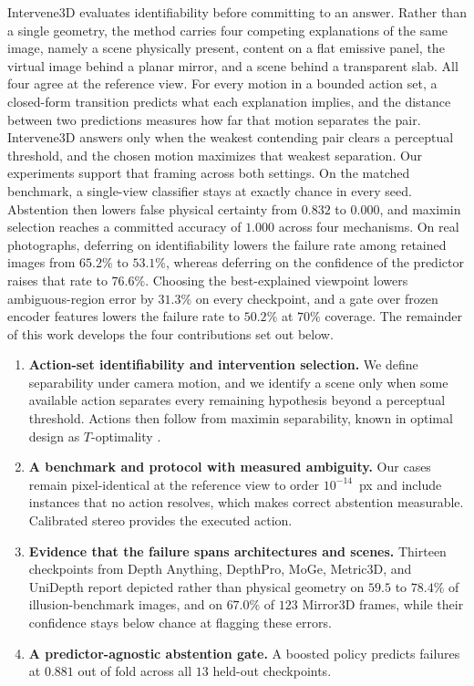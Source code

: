 \documentclass{article} %
\theoremstyle{defstyle}
\theoremstyle{plain}
\begin{document}
Intervene3D evaluates identifiability before committing to an answer. Rather than a single
geometry, the method carries four competing explanations of the same image, namely a scene
physically present, content on a flat emissive panel, the virtual image behind a planar mirror,
and a scene behind a transparent slab. All four agree at the reference view. For every motion
in a bounded action set, a closed-form transition predicts what each explanation implies, and
the distance between two predictions measures how far that motion separates the pair.
Intervene3D answers only when the weakest contending pair clears a perceptual threshold, and
the chosen motion maximizes that weakest separation. Our experiments support that framing
across both settings. On the matched benchmark, a single-view classifier stays at exactly
chance in every seed. Abstention then lowers false physical certainty from $0.832$ to $0.000$,
and maximin selection reaches a committed accuracy of $1.000$ across four mechanisms. On real
photographs, deferring on identifiability lowers the failure rate among retained images from
$65.2\%$ to $53.1\%$, whereas deferring on the confidence of the predictor raises that rate to
$76.6\%$. Choosing the best-explained viewpoint lowers ambiguous-region error by $31.3\%$ on
every checkpoint, and a gate over frozen encoder features lowers the failure rate to $50.2\%$
at $70\%$ coverage. The remainder of this work develops the four contributions set out below.

\begin{enumerate}[nosep,leftmargin=*,topsep=2pt]

\item \textbf{Action-set identifiability and intervention selection.} We define separability
under camera motion, and we identify a scene only when some available action separates every
remaining hypothesis beyond a perceptual threshold. Actions then follow from maximin
separability, known in optimal design as $T$-optimality
\citep{atkinson1975design,hunter1965experimental}.

\item \textbf{A benchmark and protocol with measured ambiguity.} Our cases remain
pixel-identical at the reference view to order $10^{-14}$~px and include instances that no
action resolves, which makes correct abstention measurable. Calibrated stereo provides the
executed action.

\item \textbf{Evidence that the failure spans architectures and scenes.} Thirteen checkpoints
from Depth Anything, DepthPro, MoGe, Metric3D, and UniDepth report depicted rather than
physical geometry on $59.5$ to $78.4\%$ of illusion-benchmark images, and on $67.0\%$ of $123$
Mirror3D frames, while their confidence stays below chance at flagging these errors.

\item \textbf{A predictor-agnostic abstention gate.} A boosted policy predicts failures at
$0.881$ out of fold across all $13$ held-out checkpoints.

\end{enumerate}
\end{document}
